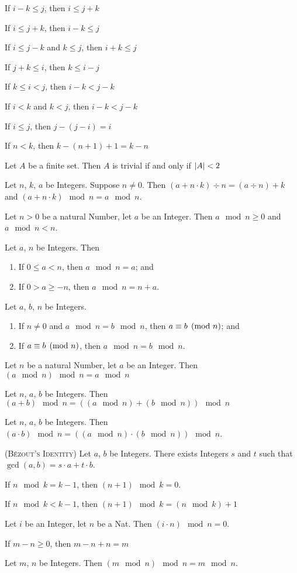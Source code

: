 \documentclass{article}
\begin{document}
\begin{thm}
\item\label{natd:52} If $i-k\leq j$, then $i\leq j+k$
\item\label{natd:53} If $i\leq j+k$, then $i-k\leq j$
\item\label{natd:54} If $i\leq j-k$ and $k\leq j$, then $i+k\leq j$
\item\label{natd:55} If $j+k\leq i$, then $k\leq i-j$
\item\label{natd:56} If $k\leq i<j$, then $i-k<j-k$
\item\label{natd:57} If $i<k$ and $k<j$, then $i-k<j-k$
\item\label{natd:58} If $i\leq j$, then $j-(j-i)=i$
\item\label{natd:59} If $n<k$, then $k-(n+1)+1=k-n$
\item\label{natd:60} Let $A$ be a finite set.
  Then $A$ is trivial if and only if $\lvert A\rvert<2$
\item\label{natd:61} Let $n$, $k$, $a$ be Integers. Suppose $n\neq0$.
  Then $(a+n\cdot k)\div n=(a\div n)+k$ and $(a+n\cdot k)\mod{n}=a\mod{n}$.
\item\label{natd:62} Let $n>0$ be a natural Number, let $a$ be an Integer.
  Then $a\mod{n}\geq0$ and $a\mod{n}<n$.
\item\label{natd:63} Let $a$, $n$ be Integers. Then
  \begin{enumerate}[label=(\roman*)]
  \item If $0\leq a<n$, then $a\mod{n}=a$; and
  \item If $0>a\geq-n$, then $a\mod{n}=n+a$.
  \end{enumerate}
\item\label{natd:64} Let $a$, $b$, $n$ be Integers.
  \begin{enumerate}[label=(\roman*)]
  \item If $n\neq0$ and $a\mod{n}=b\mod{n}$, then $a\equiv b\pmod{n}$; and
  \item If $a\equiv b\pmod{n}$, then $a\mod{n}=b\mod{n}$.
  \end{enumerate}
\item\label{natd:65} Let $n$ be a natural Number, let $a$ be an Integer.
  Then $(a\mod{n})\mod{n}=a\mod{n}$
\item\label{natd:66} Let $n$, $a$, $b$ be Integers.
  Then $(a+b)\mod{n}=((a\mod{n})+(b\mod{n}))\mod{n}$
\item\label{natd:67} Let $n$, $a$, $b$ be Integers.
  Then $(a\cdot b)\mod{n}=((a\mod{n})\cdot(b\mod{n}))\mod{n}$.
\item\label{natd:68} (\textsc{B\'{e}zout's Identity})
  Let $a$, $b$ be Integers. There exists Integers $s$ and $t$ such that
  $\gcd(a,b)=s\cdot a+t\cdot b$.
\item\label{natd:69} If $n\mod{k}=k-1$, then $(n+1)\mod{k}=0$.
\item\label{natd:70} If $n\mod{k}<k-1$, then $(n+1)\mod{k}=(n\mod{k})+1$
\item\label{natd:71} Let $i$ be an Integer, let $n$ be a Nat.
  Then $(i\cdot n)\mod{n}=0$.
\item\label{natd:72} If $m-n\geq0$, then $m-n+n=m$
\item\label{natd:73} Let $m$, $n$ be Integers.
  Then $(m\mod{n})\mod{n}=m\mod{n}$.
\end{thm}
\end{document}
